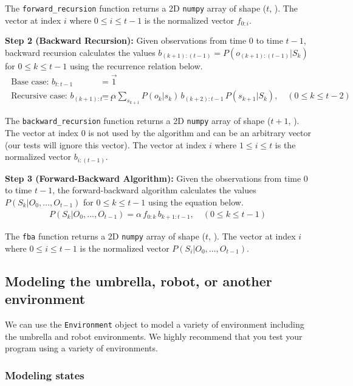 \documentclass[12pt]{article}
\begin{document}
The \verb+forward_recursion+ function returns a 2D \verb+numpy+ array of shape ($t$, ). The vector at index $i$ where $0 \le i \le t - 1$ is the normalized vector $f_{0:i}$.

{\bf Step 2 (Backward Recursion): } Given observations from time $0$ to time $t-1$, backward recursion calculates the values $b_{(k+1):(t-1)} = P(o_{(k+1):(t-1)} | S_{k})$ for $0 \le k \le t-1$ using the recurrence relation below.
%
\begin{align}
    \text{ Base case: } b_{t:t-1} & = \vec{1} \\
    \text{ Recursive case: } b_{(k+1):t-1} & = \alpha \sum_{s_{k+1}} P(o_k | s_k ) \, b_{(k+2):t-1} \, P(s_{k+1} | S_k ),\quad (0 \le k \le t-2) 
\end{align}

The \verb+backward_recursion+ function returns a 2D \verb+numpy+ array of shape ($t+1$, ). 
%
The vector at index $0$ is not used by the algorithm and can be an arbitrary vector (our tests will ignore this vector).
%
The vector at index $i$ where $1 \le i \le t$ is the normalized vector $b_{i:(t-1)}$.

{\bf Step 3 (Forward-Backward Algorithm): } Given the observations from time $0$ to time $t-1$, the forward-backward algorithm calculates the values $P(S_k | O_0, \dots, O_{t-1})$ for $0 \le k \le t-1$ using the equation below.
%
\begin{align}
P(S_k | O_0, \dots, O_{t-1}) = \alpha \, f_{0:k} \, b_{k+1:t-1}, \quad (0 \le k \le t - 1)
\end{align}

The \verb+fba+ function returns a 2D \verb+numpy+ array of shape ($t$, ). 
%
The vector at index $i$ where $0 \le i \le t-1$ is the normalized vector $P(S_i | O_0, \dots, O_{t-1})$.


\newpage
\subsection{Modeling the umbrella, robot, or another environment}
\label{sec:modeling_environment}

We can use the \verb+Environment+ object to model a variety of environment including the umbrella and robot environments. We highly recommend that you test your program using a variety of environments.

\subsubsection{Modeling states}
\end{document}
